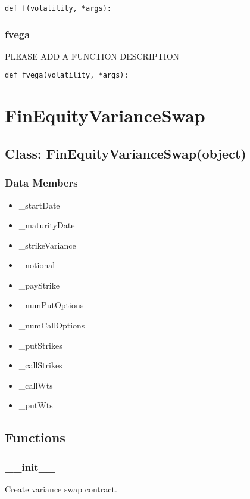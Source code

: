\documentclass[twoside,11pt]{book}
\begin{document}
\begin{lstlisting}
def f(volatility, *args):
\end{lstlisting}

\subsubsection*{{\bf fvega}}
PLEASE ADD A FUNCTION DESCRIPTION

\begin{lstlisting}
def fvega(volatility, *args):
\end{lstlisting}

\newpage
\section{FinEquityVarianceSwap}

\subsection*{Class: FinEquityVarianceSwap(object)}


\subsubsection*{Data Members}
\begin{itemize}
\item{\_startDate}
\item{\_maturityDate}
\item{\_strikeVariance}
\item{\_notional}
\item{\_payStrike}
\item{\_numPutOptions}
\item{\_numCallOptions}
\item{\_putStrikes}
\item{\_callStrikes}
\item{\_callWts}
\item{\_putWts}
\end{itemize}

\subsection*{Functions}

\subsubsection*{{\bf \_\_init\_\_}}
Create variance swap contract.  
\end{document}
